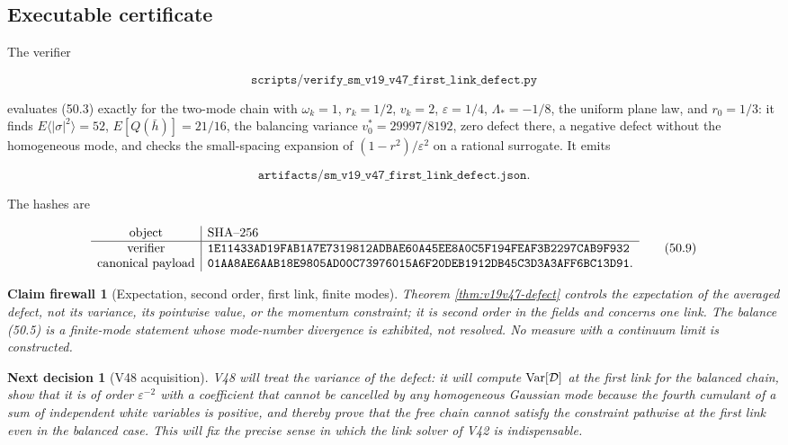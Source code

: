 \documentclass[11pt]{article}
\newtheorem{firewall}[theorem]{Claim firewall}
\newtheorem{decision}[theorem]{Next decision}
\theoremstyle{remark}
\begin{document}
\subsection{Executable certificate}

The verifier

\[
 \texttt{scripts/verify\_sm\_v19\_v47\_first\_link\_defect.py}       \tag{50.7}
\]

evaluates (50.3) exactly for the two-mode chain with
\(\omega_k=1\), \(r_k=1/2\), \(v_k=2\), \(\varepsilon=1/4\),
\(\Lambda_*=-1/8\), the uniform plane law, and \(r_0=1/3\): it finds
\(E\langle|\sigma|^2\rangle=52\), \(E[Q(\bar h)]=21/16\), the balancing
variance \(v_0^*=29997/8192\), zero defect there, a negative defect
without the homogeneous mode, and checks the small-spacing expansion
of \((1-r^2)/\varepsilon^2\) on a rational surrogate.  It emits

\[
 \texttt{artifacts/sm\_v19\_v47\_first\_link\_defect.json}.          \tag{50.8}
\]

The hashes are

\[
\begin{array}{c|l}
\hbox{object}&\hbox{SHA--256}\\ \hline
\hbox{verifier}&
\texttt{1E11433AD19FAB1A7E7319812ADBAE60A45EE8A0C5F194FEAF3B2297CAB9F932}\\
\hbox{canonical payload}&
\texttt{01AA8AE6AAB18E9805AD00C73976015A6F20DEB1912DB45C3D3A3AFF6BC13D91}.
\end{array}                                                     \tag{50.9}
\]

\begin{firewall}[Expectation, second order, first link, finite modes]
\label{fire:v19v47}
Theorem \ref{thm:v19v47-defect} controls the expectation of the
averaged defect, not its variance, its pointwise value, or the momentum
constraint; it is second order in the fields and concerns one link.
The balance (50.5) is a finite-mode statement whose mode-number
divergence is exhibited, not resolved.  No measure with a continuum
limit is constructed.
\end{firewall}

\begin{decision}[V48 acquisition]
\label{dec:v19v47-next}
V48 will treat the variance of the defect: it will compute
\(\operatorname{Var}[{\cal D}]\) at the first link for the balanced chain,
show that it is of order \(\varepsilon^{-2}\) with a coefficient that
cannot be cancelled by any homogeneous Gaussian mode because the
fourth cumulant of a sum of independent white variables is positive,
and thereby prove that the free chain cannot satisfy the constraint
pathwise at the first link even in the balanced case.  This will fix
the precise sense in which the link solver of V42 is indispensable.
\end{decision}
\end{document}
